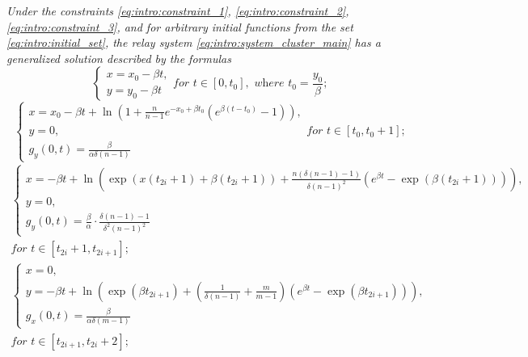 \textit{Under the constraints \eqref{eq:intro:constraint_1}, \eqref{eq:intro:constraint_2}, \eqref{eq:intro:constraint_3}, and for arbitrary initial functions from the set \eqref{eq:intro:initial_set}, the relay system \eqref{eq:intro:system_cluster_main} has a generalized solution described by the formulas}
%
\small
\begin{equation}
	\label{eq:intro:step1_solution}
	\begin{cases}
		x = x_0 - \beta t,\\
		y = y_0 - \beta t
	\end{cases}
	\textit{for } t \in [0, t_0], \textit{ where } t_0 = \dfrac{y_0}{\beta};
\end{equation}
%
\begin{equation}
	\label{eq:intro:step2_solution}
	\begin{cases}
		x = x_0 - \beta t + \ln\left(1 + \frac{n}{n - 1} e^{-x_0 + \beta t_0}  (e^{\beta  (t - t_0)} - 1)\right),\\
		y = 0,\\
		g_y(0, t) = \frac{\beta}{\alpha \delta (n - 1)}
	\end{cases}
	\textit{for } t \in [t_0, t_0 + 1];
\end{equation}
%
\begin{multline}
	\label{eq:intro:step3_solution}
	\begin{cases}
		x = -\beta t + \ln\left(\exp(x(t_{2i} + 1) + \beta (t_{2i} + 1)) + \frac{n (\delta(n - 1) - 1)}{\delta (n - 1)^2} (e^{\beta t} - \exp(\beta (t_{2i} + 1)))\right)
		,\\
		y = 0,\\
		g_y(0, t) = \frac{\beta}{\alpha} \cdot \frac{\delta (n - 1) - 1}{\delta^2 (n - 1)^2}
	\end{cases}\\
	\textit{for } t \in [t_{2i} + 1, t_{2i + 1}];
\end{multline}
%
\begin{multline}
	\label{eq:intro:step4_solution}
	\begin{cases}
		x = 0,\\
		y = -\beta t + \ln\left(\exp(\beta t_{2i + 1}) + \left(\frac{1}{\delta(n - 1)} + \frac{m}{m - 1}\right) (e^{\beta t} - \exp(\beta t_{2i + 1}))\right),\\
		g_x(0, t) = \frac{\beta}{\alpha \delta (m - 1)}
	\end{cases}\\
	\textit{for } t \in [t_{2i + 1}, t_{2i} + 2];
\end{multline}
